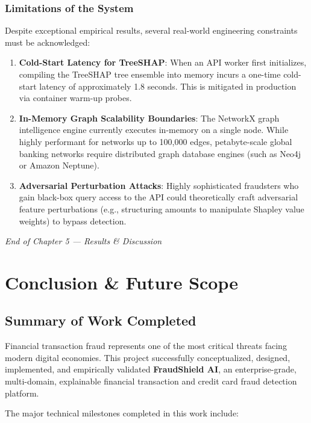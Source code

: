 \documentclass[12pt,a4paper,oneside]{report}
\begin{document}
\subsection{Limitations of the System}

Despite exceptional empirical results, several real-world engineering constraints must be acknowledged:

\begin{enumerate}[leftmargin=0.35in]
\item \textbf{Cold-Start Latency for TreeSHAP}: When an API worker first initializes, compiling the TreeSHAP tree ensemble into memory incurs a one-time cold-start latency of approximately 1.8 seconds. This is mitigated in production via container warm-up probes.
\item \textbf{In-Memory Graph Scalability Boundaries}: The NetworkX graph intelligence engine currently executes in-memory on a single node. While highly performant for networks up to 100,000 edges, petabyte-scale global banking networks require distributed graph database engines (such as Neo4j or Amazon Neptune).
\item \textbf{Adversarial Perturbation Attacks}: Highly sophisticated fraudsters who gain black-box query access to the API could theoretically craft adversarial feature perturbations (e.g., structuring amounts to manipulate Shapley value weights) to bypass detection.
\end{enumerate}


\textit{End of Chapter 5 --- Results \& Discussion}


\newpage


\chapter{Conclusion \& Future Scope}

\section{Summary of Work Completed}

Financial transaction fraud represents one of the most critical threats facing modern digital economies. This project successfully conceptualized, designed, implemented, and empirically validated \textbf{FraudShield AI}, an enterprise-grade, multi-domain, explainable financial transaction and credit card fraud detection platform.


The major technical milestones completed in this work include:
\end{document}
